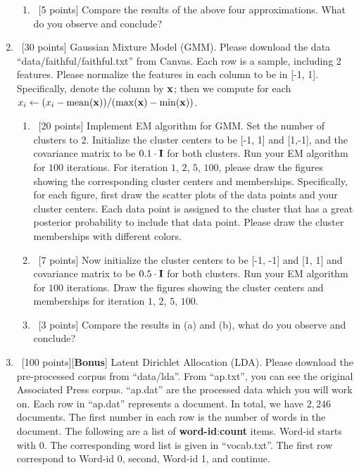 \documentclass[12pt, fullpage,letterpaper]{article}
\begin{document}
\begin{enumerate}
\begin{enumerate}
		\item~[5 points] Compare the results of the above four approximations. What do you observe and conclude?
	\end{enumerate}

	\item~[30 points] Gaussian Mixture Model (GMM). Please download the data ``data/faithful/faithful.txt''  from Canvas. Each row is a sample, including 2 features. Please normalize the features in each column to be in [-1, 1]. Specifically, denote the column by ${\bf x}$; then we compute for each $x_i \leftarrow (x_i - \mathrm{mean}({\bf x}))/(\max({\bf x}) - \min({\bf x}))$. 
	\begin{enumerate}
		\item~[20 points] Implement EM algorithm for GMM. Set the number of clusters to $2$. Initialize the cluster centers to be [-1, 1] and [1,-1], and the covariance matrix to be $0.1\cdot{\bf I}$ for both clusters. Run your EM algorithm for $100$ iterations. For iteration $1$, $2$, $5$, $100$, please draw the figures showing the corresponding cluster centers and memberships. Specifically, for each figure, first draw the scatter plots of the data points and your cluster centers. Each data point is assigned to the cluster that has a great posterior probability to include that data point. Please draw the cluster memberships with different colors. 
		\item~[7 points] Now initialize the cluster centers to be [-1, -1] and [1, 1] and covariance matrix to be $0.5 \cdot {\bf I}$ for both clusters. Run your EM algorithm for $100$ iterations. Draw the figures showing the cluster centers and memberships for iteration $1$, $2$, $5$, $100$. 
		\item~[3 points] Compare the results in (a) and (b), what do you observe and conclude?
	\end{enumerate}

	\item~[100 points][\textbf{Bonus}] Latent Dirichlet Allocation (LDA). Please download the pre-processed corpus from ``data/lda''. From ``ap.txt'', you can see the original Associated Press corpus. ``ap.dat'' are the processed data which you will work on. Each row in ``ap.dat'' represents a document. In total, we have $2,246$ documents. The first number in each row is the number of words in the document. The following are a list of  \textbf{word-id}:\textbf{count} items. Word-id starts with 0. The corresponding word list is given in ``vocab.txt''. The first row correspond to Word-id 0, second, Word-id 1, and continue. 
	

\end{enumerate}
\end{document}
